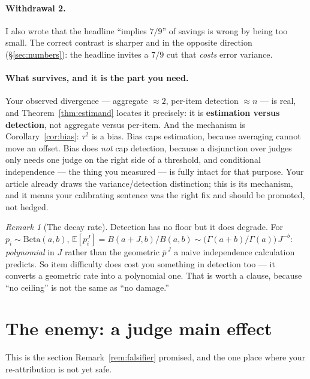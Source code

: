 \documentclass[11pt]{article}
\theoremstyle{plain}
\theoremstyle{definition}
\theoremstyle{remark}
\newtheorem{remark}[theorem]{Remark}
\newcommand{\E}{\mathbb{E}}
\begin{document}
\paragraph{Withdrawal 2.} I also wrote that the headline ``implies $7/9$'' of savings is wrong by
being too small. The correct contrast is sharper and in the opposite direction
(\S\ref{sec:numbers}): the headline invites a $7/9$ cut that \emph{costs} error variance.

\paragraph{What survives, and it is the part you need.} Your observed divergence --- aggregate
$\approx2$, per-item detection $\approx n$ --- is real, and Theorem~\ref{thm:estimand} locates it
precisely: it is \textbf{estimation versus detection}, not aggregate versus per-item. And the
mechanism is Corollary~\ref{cor:bias}: $\tau^2$ is a bias. Bias caps estimation, because
averaging cannot move an offset. Bias does \emph{not} cap detection, because a disjunction over
judges only needs one judge on the right side of a threshold, and conditional independence --- the
thing you measured --- is fully intact for that purpose. Your article already draws the
variance/detection distinction; this is its mechanism, and it means your calibrating sentence
was the right fix and should be promoted, not hedged.

\begin{remark}[The decay rate]
Detection has no floor but it does degrade. For $p_i\sim\mathrm{Beta}(a,b)$,
$\E[p_i^J]=B(a+J,b)/B(a,b)\sim\big(\Gamma(a+b)/\Gamma(a)\big)\,J^{-b}$: \emph{polynomial} in $J$ rather than the
geometric $\bar p^{\,J}$ a naive independence calculation predicts. So item difficulty does cost
you something in detection too --- it converts a geometric rate into a polynomial one. That is
worth a clause, because ``no ceiling'' is not the same as ``no damage.''
\end{remark}

\section{The enemy: a judge main effect}\label{sec:enemy}

This is the section Remark~\ref{rem:falsifier} promised, and the one place where your
re-attribution is not yet safe.
\end{document}
